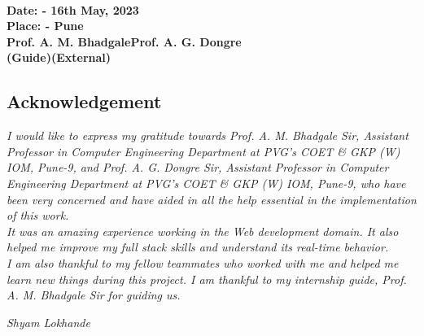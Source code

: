 \documentclass[12pt]{article}
\begin{document}
\\
\bigskip
\textbf{Date: - 16th May, 2023}\\
\medskip
\textbf{Place: - Pune}\\
\vspace{1.5cm}
\textbf{Prof. A. M. Bhadgale\hspace{5cm}Prof. A. G. Dongre}\\
\textbf{(Guide)\hspace{6.65cm}(External)}
\pagebreak
\begin{center}
    \section*{Acknowledgement}
\end{center}
\bigskip
 \emph{I would like to express my gratitude towards Prof. A. M. Bhadgale Sir, Assistant Professor in Computer Engineering Department at PVG’s COET \& GKP (W) IOM, Pune-9, and Prof. A. G. Dongre Sir, Assistant Professor in Computer Engineering Department at PVG’s COET \& GKP (W) IOM, Pune-9, who have been very concerned and have aided in all the help essential in the implementation of this work. }\\
 
 \medskip
 \emph{It was an amazing experience working in the Web development domain. It also helped me improve my full stack skills and understand its real-time behavior. }\\
 \medskip
 \emph{I am also thankful to my fellow teammates who worked with me and helped me learn new things during this project. I am thankful to my internship guide, Prof. A. M. Bhadgale Sir for guiding us.}\\
 \smallskip
 
\vspace{1.5cm}
{\hfill\emph{Shyam Lokhande}}\\
\end{document}
